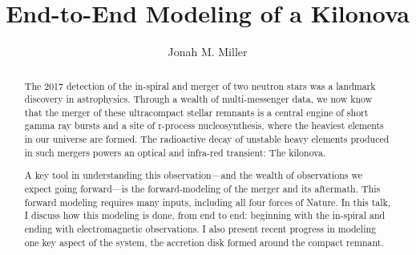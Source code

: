 \documentclass[letter,nofootinbib,superscriptaddress,twocolumn]{revtex4-1}
\begin{document}
\title{End-to-End Modeling of a Kilonova}

\author{Jonah M. Miller}

\begin{abstract}

  The 2017 detection of the in-spiral and merger of two neutron stars
  was a landmark discovery in astrophysics. Through a wealth of
  multi-messenger data, we now know that the merger of these
  ultracompact stellar remnants is a central engine of short gamma ray
  bursts and a site of r-process nucleosynthesis, where the heaviest
  elements in our universe are formed. The radioactive decay of
  unstable heavy elements produced in such mergers powers an optical
  and infra-red transient: The kilonova.

  A key tool in understanding this observation---and the wealth of
  observations we expect going forward---is the forward-modeling of
  the merger and its aftermath. This forward modeling requires many
  inputs, including all four forces of Nature.
  In this talk, I discuss how this modeling is done, from
  end to end: beginning with the in-spiral and ending with electromagnetic
  observations. I also present recent progress in modeling one
  key aspect of the system, the accretion disk formed around the
  compact remnant.

\end{abstract}

\maketitle
\end{document}
